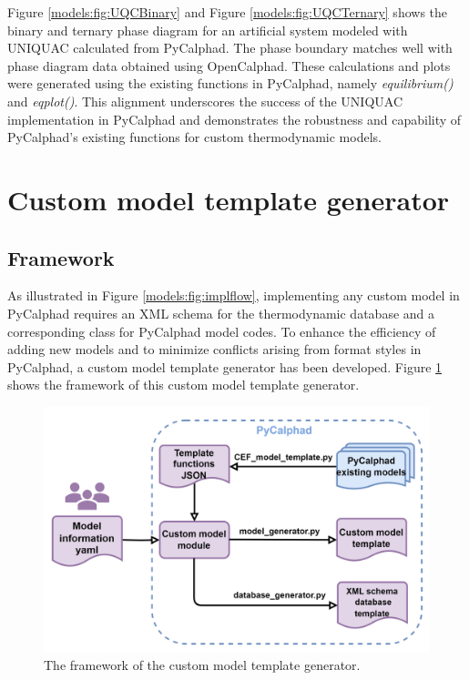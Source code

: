 Figure \ref{models:fig:UQCBinary} and Figure \ref{models:fig:UQCTernary} shows the binary and ternary phase diagram for an artificial system modeled with UNIQUAC calculated from PyCalphad. The phase boundary matches well with phase diagram data obtained using OpenCalphad. These calculations and plots were generated using the existing functions in PyCalphad, namely \textit{equilibrium()} and \textit{eqplot()}. This alignment underscores the success of the UNIQUAC implementation in PyCalphad and demonstrates the robustness and capability of PyCalphad's existing functions for custom thermodynamic models.

\section{Custom model template generator} \label{models:sec:CMTG}
\subsection{Framework} \label{models:ssec:CMTGframework}
As illustrated in Figure \ref{models:fig:implflow}, implementing any custom model in PyCalphad requires an XML schema for the thermodynamic database and a corresponding class for PyCalphad model codes. To enhance the efficiency of adding new models and to minimize conflicts arising from format styles in PyCalphad, a custom model template generator has been developed. Figure \ref{models:fig:CMGFrame} shows the framework of this custom model template generator.

\begin{figure}[H]
    \centering
    \includegraphics[width=0.8\linewidth]{models/Models-CMG-Framework.png}
    \caption{The framework of the custom model template generator.}
    \label{models:fig:CMGFrame}
\end{figure}

